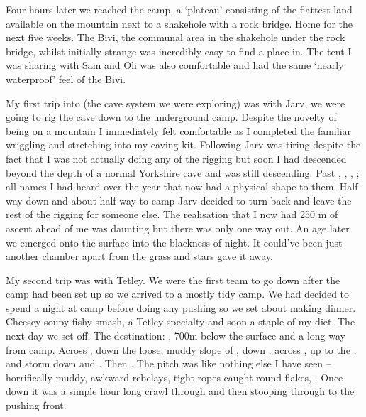 Four hours later we reached the camp, a ‘plateau’ consisting of the flattest land available on the mountain next to a shakehole with a rock bridge. Home for the next five weeks. The Bivi, the communal area in the shakehole under the rock bridge, whilst initially strange was incredibly easy to find a place in. The tent I was sharing with Sam and Oli was also comfortable and had the same ‘nearly waterproof’ feel of the Bivi.

My first trip into  (the cave system we were exploring) was with Jarv, we were going to rig the cave down to the underground camp. Despite the novelty of being on a mountain I immediately felt comfortable as I completed the familiar wriggling and stretching into my caving kit. Following Jarv was tiring despite the fact that I was not actually doing any of the rigging but soon I had descended beyond the depth of a normal Yorkshire cave and was still descending. Past , , , ; all names I had heard over the year that now had a physical shape to them. Half way down  and about half way to camp Jarv decided to turn back and leave the rest of the rigging for someone else. The realisation that I now had 250 m of ascent ahead of me was daunting but there was only one way out. An age later we emerged onto the surface into the blackness of night. It could’ve been just another chamber apart from the grass and stars gave it away.

My second trip was with Tetley. We were the first team to go down after the camp had been set up so we arrived to a mostly tidy camp. We had decided to spend a night at camp before doing any pushing so we set about making dinner. Cheesey soupy fishy smash, a Tetley specialty and soon a staple of my diet. The next day we set off. The destination: , 700m below the surface and a long way from camp. Across , down the loose, muddy slope of , down , across , up to the , and storm down  and . Then . The pitch was like nothing else I have seen -- horrifically muddy, awkward rebelays, tight ropes caught round flakes, . Once down it was a simple hour long crawl through  and then stooping through  to the pushing front.


